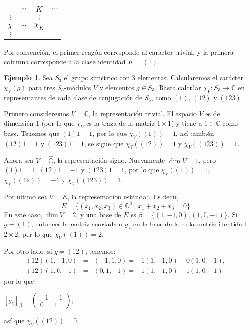 \documentclass[12pt]{book}
\theoremstyle{definition}
\newtheorem{example}[theorem]{Ejemplo}
\newcounter{in}
\begin{document}
\begin{center}
  \begin{tabular}{c |c c c}
    & $\cdots$ & $K$ & $\cdots$\\
    \hline
    $\vdots$ &  & $\vdots$  \\
    $\chi$   & $\cdots$ & $\chi_{K}$  \\
    $\vdots$ &          &   
  \end{tabular}
\end{center}
Por convención, el primer rengón corresponde al caracter trivial, y la
primera columna corresponde a la clase identidad $K=(1)$.

\begin{example}
  Sea $S_{3}$ el grupo simétrico con 3 elementos. Calcularemos el
  carácter $\chi_{V}(g)$ para tres $S_{3}$-módulos $V$ y elementos
  $g\in S_{3}$. Basta calcular $\chi_{V}:S_{3}\rightarrow\mathbb{C}$
  en representantes de cada clase de conjugación de $S_{3}$, como $(1)$,
  $(12)$ y $(123)$.
  
  Primero consideremos $V=\mathbb{C}$, la representación trivial. El
  espacio $V$ es de dimensión $1$ (por lo que $\chi_{V}$ es la traza de
  la matriz $1\times 1$) y tiene a $1\in \mathbb{C}$ como
  base. Tenemos que $(1)1=1$, por lo que $\chi_{V}((1))=1$, así también
  $(12)1=1$ y $(123)1=1$, se sigue que $\chi_{V}((12))=1$ y
  $\chi_{V}((123))=1$.

  Ahora sea $V=\mathbb{\hat C}$, la representación signo. Nuevamente
  $\dim V=1$, pero $(1)1=1$, $(12)1=-1$ y $(123)1=1$, por lo que
  $\chi_{V}((1))=1$,  $\chi_{V}((12))=-1$ y  $\chi_{V}((123))=1$.

  Por último sea $V=E$, la representación estándar. Es decir,
  \begin{equation*}
    E=\{(x_{1},x_{2},x_{3})\in \mathbb{C}^{3}\mid x_{1}+x_{2}+x_{3}=0\}
  \end{equation*}
  En este caso, $\dim V=2$, y una base de $E$ es
  $\beta=\{(1,-1,0),(1,0,-1)\}$. Si $g=(1)$, entonces la matriz
  asociada a $g_{V}$ en la base dada es la matriz identidad $2\times
  2$, por lo que $\chi_{V}((1))=2$.
  
  Por otro lado, si $g=(12)$, tenemos:
  \begin{eqnarray*}
    (12)(1,-1,0)&=&(-1,1,0)=-1(1,-1,0)+0(1,0,-1),\\
    (12)(1,0,-1)&=&(0,1,-1)=-1(1,-1,0)+1(1,0,-1)
  \end{eqnarray*} 
  por lo que 
  \begin{center}
  $[g_{V}]_{\beta}=
  \begin{pmatrix}
    -1 & -1 \\
    0 & 1 
  \end{pmatrix}$,
\end{center}
así que $\chi_{V}((12))=0$.


\end{example}
\end{document}

